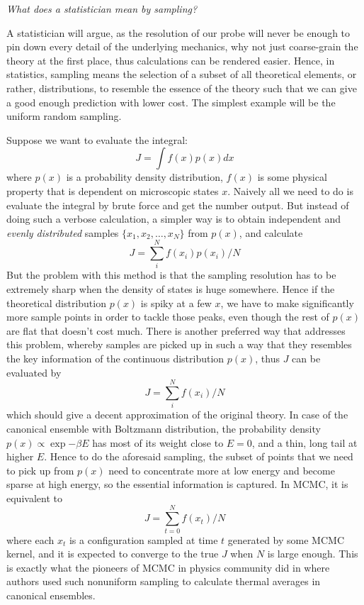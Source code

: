 \documentclass{article}
\begin{document}
\bigskip
\textit{What does a statistician mean by \emph{sampling}?}

A statistician will argue, as the resolution of our probe will never be enough to pin down every detail of the underlying mechanics, why not just coarse-grain the theory at the first place, thus calculations can be rendered easier. Hence, in statistics, sampling means the selection of a subset of all theoretical elements, or rather, distributions, to resemble the essence of the theory such that we can give a good enough prediction with lower cost. The simplest example will be the uniform random sampling.  


Suppose we want to evaluate the integral:
\begin{equation}
    J = \int f(x) p(x) dx 
\end{equation}
where $p(x)$ is a probability density distribution, $f(x)$ is some physical property that is dependent on microscopic states $x$. Naively all we need to do is evaluate the integral by brute force and get the number output. But instead of doing such a verbose calculation, a simpler way is to obtain
independent and \emph{evenly distributed} samples $\{x_1, x_2, \ldots, x_N\}$ from $p(x)$, and calculate
\begin{equation}
    J = \sum_i^N f(x_i) p(x_i) / N
\end{equation}
But the problem with this method is that the sampling resolution has to be extremely sharp when the density of states is huge somewhere. Hence if the theoretical distribution $p(x)$ is spiky at a few $x$, we have to make significantly more sample points in order to tackle those peaks, even though the rest of $p(x)$ are flat that doesn't cost much. There is another preferred way that addresses this problem, whereby samples are picked up in such a way that they resembles the key information of the continuous distribution $p(x)$, thus $J$ can be evaluated by
\begin{equation}
    J = \sum_i^N f(x_i) / N
\end{equation}
which should give a decent approximation of the original theory. In case of the canonical ensemble with Boltzmann distribution, the probability density $p(x) \propto \exp{-\beta E}$ has most of its weight close to $E = 0$, and a thin, long tail at higher $E$. Hence to do the aforesaid sampling, the subset of points that we need to pick up from $p(x)$ need to concentrate more at low energy and become sparse at high energy, so the essential information is captured. In MCMC, it is equivalent to
\begin{equation}
    J = \sum_{t=0}^N f(x_t) / N
\end{equation}
where each $x_t$ is a configuration sampled at time $t$ generated by some MCMC kernel, and it is expected to  converge to the true $J$ when $N$ is large enough. This is exactly what the pioneers of MCMC in physics community did in \cite{MetropolisPhys} where authors used such nonuniform sampling to calculate thermal averages in canonical ensembles. 
\end{document}
